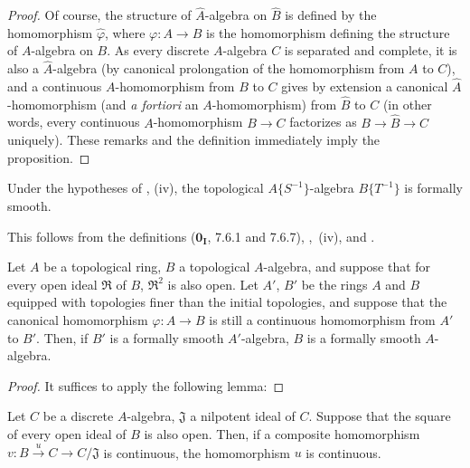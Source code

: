 \begin{proof}
Of course, the structure of $\widehat{A}$-algebra on $\widehat{B}$ is defined by the homomorphism $\hat{\varphi}$, where $\varphi:A\to B$ is the homomorphism defining the structure of $A$-algebra on $B$.
As every discrete $A$-algebra $C$ is separated and complete, it is also a $\widehat{A}$-algebra (by canonical prolongation of the homomorphism from $A$ to $C$), and a continuous $A$-homomorphism from $B$ to $C$ gives by extension a canonical $\widehat{A}$-homomorphism (and \emph{a fortiori} an $A$-homomorphism) from $\widehat{B}$ to $C$ (in other words, every continuous $A$-homomorphism $B\to C$ factorizes as $B\to\widehat{B}\to C$ uniquely).
These remarks and the definition  immediately imply the proposition.
\end{proof}

\begin{corollary}[19.3.7]
\label{0.19.3.7}
Under the hypotheses of , (iv), the topological $A\{S^{-1}\}$-algebra $B\{T^{-1}\}$ is formally smooth.
\end{corollary}

This follows from the definitions ($\mathbf{0_I}$, 7.6.1 and 7.6.7),
,~(iv), and .

\begin{proposition}[19.3.8]
\label{0.19.3.8}
Let $A$ be a topological ring, $B$ a topological $A$-algebra, and suppose that for every open ideal $\mathfrak{R}$ of $B$, $\mathfrak{R}^2$ is also open.
Let $A'$, $B'$ be the rings $A$ and $B$ equipped with topologies finer than the initial topologies, and suppose that the canonical homomorphism $\varphi:A\to B$ is still a continuous homomorphism from $A'$ to $B'$.
Then, if $B'$ is a formally smooth $A'$-algebra, $B$ is a formally smooth $A$-algebra.
\end{proposition}

\begin{proof}
It suffices to apply the following lemma:
\end{proof}

\begin{lemma}[19.3.8.1]
\label{0.19.3.8.1}
Let $C$ be a discrete $A$-algebra, $\mathfrak{J}$ a nilpotent ideal of $C$.
Suppose that the square of every open ideal of $B$ is also open.
Then, if a composite homomorphism $v:B\xrightarrow{u}C\to C/\mathfrak{J}$ is continuous, the homomorphism $u$ is continuous.
\end{lemma}

